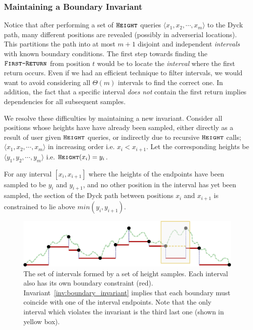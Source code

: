 \subsubsection{Maintaining a Boundary Invariant}
\label{sec:maintaining_a_boundary_invariant}
Notice that after performing a set of $\texttt{\textsc{Height}}$ queries $\langle x_1, x_2,\cdots, x_m \rangle$ to the Dyck path,
many different positions are revealed (possibly in adverserial locations).
This partitions the path into at most $m+1$ disjoint and independent \emph{intervals} with known boundary conditions.
The first step towards finding the $\texttt{\textsc{First-Return}}$ from position $t$ would be to locate the \emph{interval} where the first return occurs.
Even if we had an efficient technique to filter intervals, we would want to avoid considering all $\Theta(m)$ intervals to find the correct one.
In addition, the fact that a specific interval \emph{does not} contain the first return implies dependencies for all subsequent samples.

We resolve these difficulties by maintaining a new invariant.
Consider all positions whose heights have have already been sampled, either directly as a result of user given $\texttt{\textsc{Height}}$ queries,
or indirectly due to recursive $\texttt{\textsc{Height}}$ calls; $\langle x_1, x_2,\cdots, x_m \rangle$ in increasing order i.e. $x_i<x_{i+1}$.
Let the corresponding heights be $ \langle y_1, y_2,\cdots, y_m \rangle$ i.e. $\texttt{\textsc{Height}}(x_i) = y_i$.
\begin{invariant}
\label{inv:boundary_invariant}
For any interval $[x_i,x_{i+1}]$ where the heights  of the endpoints have been sampled to be $y_i$ and $y_{i+1}$,
and no other position in the interval has yet been sampled,
the section of the Dyck path between positions $x_i$ and $x_{i+1}$ is constrained to lie above $min(y_i, y_{i+1})$.
\end{invariant}
\begin{figure}[htpb]
    \centering
    \includegraphics[width=\textwidth]{images/dyck_boundary_invariant.pdf}
    \caption{The set of intervals formed by a set of height samples.
        Each interval also has its own boundary constraint (red).
        Invariant~\ref{inv:boundary_invariant} implies that each boundary must coincide with one of the interval endpoints.
        Note that the only interval which violates the invariant is the third last one (shown in yellow box).}
    \label{fig:dyck_boundary_invariant}
\end{figure}

